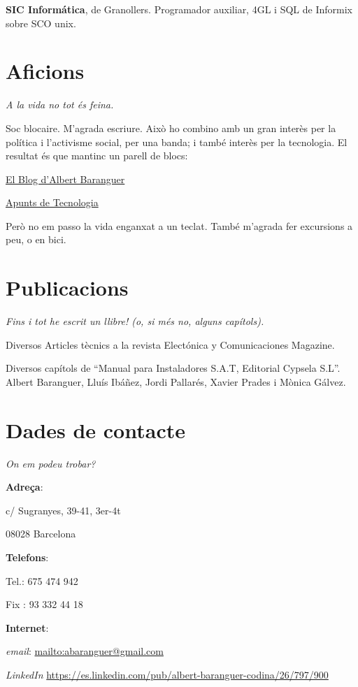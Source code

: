 \documentclass[11pt]{article}
\begin{document}
\textbf{SIC Informática}, de Granollers.
Programador auxiliar, 4GL i SQL de Informix sobre SCO unix.
\section{Aficions}
\label{sec-6}

\emph{A la vida no tot és feina.}

Soc blocaire. M'agrada escriure. Això ho combino amb un gran interès per la política i l'activisme social, per una banda; i també interès per la tecnologia. El resultat és que mantinc un parell de blocs:

\href{http://www.albertbaranguer.cat/?m=1}{El Blog d'Albert Baranguer}

\href{http://stsoftlliure.wordpress.com}{Apunts de Tecnologia}

Però no em passo la vida enganxat a un teclat. També m'agrada fer excursions a peu, o en bici.
\section{Publicacions}
\label{sec-7}

\emph{Fins i tot he escrit un llibre! (o, si més no, alguns capítols).}

Diversos Articles tècnics a la revista Electónica y Comunicaciones Magazine.

Diversos capítols de ``Manual para Instaladores S.A.T, Editorial Cypsela S.L''. Albert Baranguer, Lluís Ibáñez, Jordi Pallarés, Xavier Prades i Mònica Gálvez.
\section{Dades de contacte}
\label{sec-8}

\emph{On em podeu trobar?}

\textbf{Adreça}:

c/ Sugranyes, 39-41, 3er-4t

08028 Barcelona

\textbf{Telefons}:

Tel.: 675 474 942

Fix : 93 332 44 18

\textbf{Internet}:

\emph{email}: \href{mailto:abaranguer@gmail.com}{mailto:abaranguer@gmail.com}

\emph{LinkedIn} \href{https://es.linkedin.com/pub/albert-baranguer-codina/26/797/900}{https://es.linkedin.com/pub/albert-baranguer-codina/26/797/900}
\end{document}
